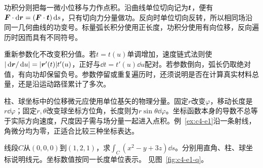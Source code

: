 功积分则把每一微小位移与力作点积。沿曲线单位切向记为$\bm{t}$，便有$\bm{F}\cdot\mathop{}\!\mathrm d\bm{r}=(\bm{F}\cdot\bm{t})\mathop{}\!\mathrm d s$，只有切向力分量做功。反向时单位切向反转，所以相同场沿同一几何曲线的功变号。标量弧长积分使用正长度，功积分使用有向位移，反向遍历时因而具有不同符号。

重新参数化不改变积分值。若$t=t(u)$单调增加，速度链式法则使$|\mathop{}\!\mathrm d\bm{r}/\mathop{}\!\mathrm d u|=|\bm{r}'(t)|t'(u)$，正好与$\dd t=t'(u)\dd u$配对。若参数倒向，弧长仍取绝对值，有向功却保留负号。参数停留或重复遍历时，还须说明是否在计算真实材料总量，还是沿运动路径累计了多次。

柱、球坐标中的位移微元应使用单位基矢的物理分量。固定$r$改变$\varphi$，移动长度是$r\dd\varphi$；固定$r,\theta$改变球坐标方位角，长度则为$r\sin\theta\dd\varphi$。坐标函数本身的导数不总等于实际方向速度，尺度因子需与场分量一起进入点积。例~\ref{ex:c4-e1}沿一条射线，角微分均为零，正适合比较三种坐标表达。

\begin{example}[同一线积分的三种坐标]\label{ex:c4-e1}
线段$C$从$(0,0,0)$到$(1,2,1)$，求$\int_C(x^2-y+3z)\dd s$。分别用直角、柱、球坐标说明线元。坐标数值按同一长度单位表示。 见图~\ref{fig:c4-e1-q}。
\end{example}

